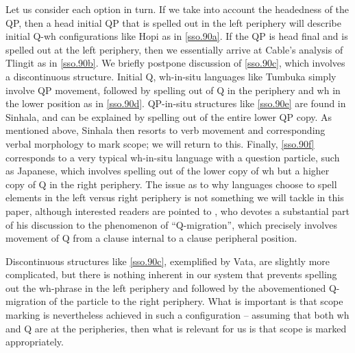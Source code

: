 \documentclass{glossa}
\begin{document}
Let us consider each option in turn. If we take into account the headedness of the QP, then a head initial QP that is spelled out in the left periphery will describe initial Q-wh configurations like Hopi as in \ref{sso.90a}. If the QP is head final and is spelled out at the left periphery, then we essentially arrive at Cable's \citeyear{cable:2007} analysis of Tlingit as in \ref{sso.90b}. We briefly postpone discussion of \ref{sso.90c}, which involves a discontinuous structure. Initial Q, wh-in-situ languages like Tumbuka simply involve QP movement, followed by spelling out of Q in the periphery and wh in the lower position as in \ref{sso.90d}. QP-in-situ structures like \ref{sso.90e} are found in Sinhala, and can be explained by spelling out of the entire lower QP copy. As mentioned above, Sinhala then resorts to verb movement and corresponding verbal morphology to mark scope; we will return to this. Finally, \ref{sso.90f} corresponds to a very typical wh-in-situ language with a question particle, such as Japanese, which involves spelling out of the lower copy of wh but a higher copy of Q in the right periphery. The issue as to why languages choose to spell elements in the left versus right periphery is not something we will tackle in this paper, although interested readers are pointed to \cite{hagstrom:1998}, who devotes a substantial part of his discussion to the phenomenon of ``Q-migration'', which precisely involves movement of Q from a clause internal to a clause peripheral position.

Discontinuous structures like \ref{sso.90c}, exemplified by Vata, are slightly more complicated, but there is nothing inherent in our system that prevents spelling out the wh-phrase in the left periphery and followed by the abovementioned Q-migration of the particle to the right periphery. What is important is that scope marking is nevertheless achieved in such a configuration -- assuming that both wh and Q are at the peripheries, then what is relevant for us is that scope is marked appropriately.
\end{document}
